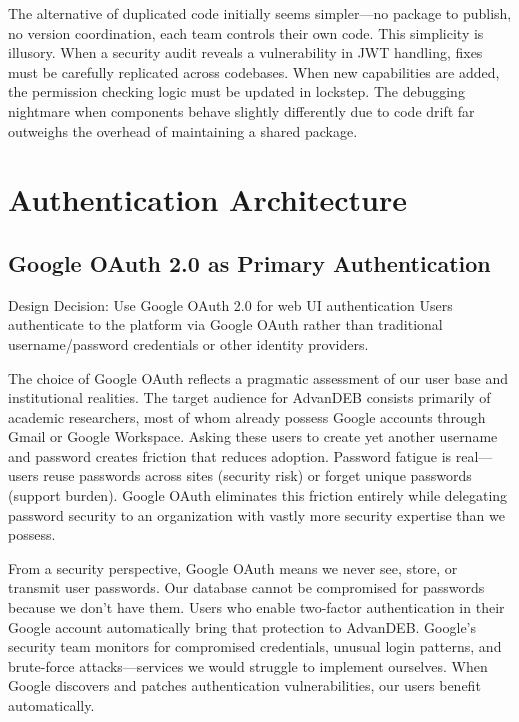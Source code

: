 \documentclass[12pt,a4paper]{article}
\begin{document}
The alternative of duplicated code initially seems simpler—no package to publish, no version coordination, each team controls their own code. This simplicity is illusory. When a security audit reveals a vulnerability in JWT handling, fixes must be carefully replicated across codebases. When new capabilities are added, the permission checking logic must be updated in lockstep. The debugging nightmare when components behave slightly differently due to code drift far outweighs the overhead of maintaining a shared package.

\section{Authentication Architecture}

\subsection{Google OAuth 2.0 as Primary Authentication}

\begin{rationale}{Design Decision: Use Google OAuth 2.0 for web UI authentication}
Users authenticate to the platform via Google OAuth rather than traditional username/password credentials or other identity providers.
\end{rationale}

The choice of Google OAuth reflects a pragmatic assessment of our user base and institutional realities. The target audience for AdvanDEB consists primarily of academic researchers, most of whom already possess Google accounts through Gmail or Google Workspace. Asking these users to create yet another username and password creates friction that reduces adoption. Password fatigue is real—users reuse passwords across sites (security risk) or forget unique passwords (support burden). Google OAuth eliminates this friction entirely while delegating password security to an organization with vastly more security expertise than we possess.

From a security perspective, Google OAuth means we never see, store, or transmit user passwords. Our database cannot be compromised for passwords because we don't have them. Users who enable two-factor authentication in their Google account automatically bring that protection to AdvanDEB. Google's security team monitors for compromised credentials, unusual login patterns, and brute-force attacks—services we would struggle to implement ourselves. When Google discovers and patches authentication vulnerabilities, our users benefit automatically.
\end{document}
